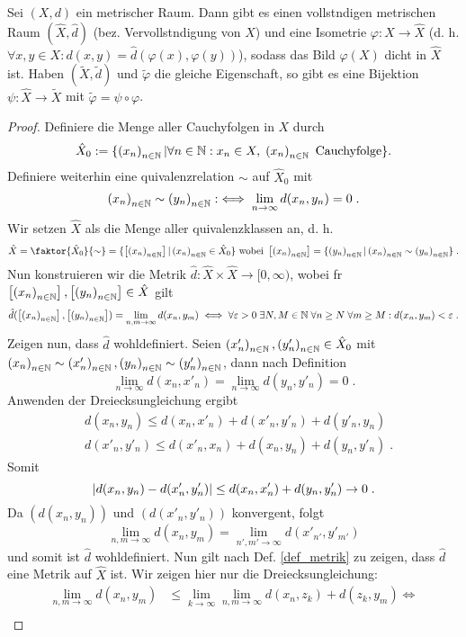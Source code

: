 \begin{theorem}
	Sei $(X,d)$ ein metrischer Raum. Dann gibt es einen vollst\as ndigen metrischen Raum $(\hat X, \hat d)$ (bez. Vervollst\as ndigung von $X$) und eine Isometrie \(\varphi: X \to \hat X\) (d. h. \(\forall x, y \in X: d(x,y) = \hat d (\varphi(x), \varphi(y))\)), sodass das Bild $\varphi(X)$ dicht in $\hat X$ ist. Haben $(\tilde X, \tilde d)$ und $\tilde \varphi$ die gleiche Eigenschaft, so gibt es eine Bijektion \(\psi: \hat X \to \tilde X\) mit \(\tilde \varphi = \psi \circ \varphi\).
	\label{vervollst_mR}
\end{theorem}
\begin{proof}
	Definiere die Menge aller Cauchyfolgen in $X$ durch 
	\[\hat X_0 := \{\left (x_n\right )_{n\in \mathbb{N}} \vert \forall n \in \mathbb{N}: x_n \in X, \; \left (x_n\right )_{n\in \mathbb{N}} \text{ Cauchyfolge}\}.\]
	Definiere weiterhin eine \As quivalenzrelation $\sim$ auf $\hat X_0$ mit 
	\[\left (x_n\right )_{n\in \mathbb{N}} \sim \left (y_n\right )_{n\in \mathbb{N}} :\iff \lim_{n\to\infty} d(x_n, y_n) = 0\;.\]
	Wir setzen $\hat X$ als die Menge aller \As quivalenzklassen an, d. h.
	\[\hat X = \faktor{\hat X_0}{\sim} = \{\equ{\seq xn} \vert \seq xn \in \hat X_0\} \text { wobei } \equ{\seq xn} = \{\seq yn \vert \seq xn \sim \seq yn\}\;. \]
	Nun konstruieren wir die Metrik $\hat d: \hat X \times \hat X \to  [0, \infty) $, wobei f\us r \(\left[ \left (x_n\right )_{n\in \mathbb{N}}\right], \left[ \left (y_n\right )_{n\in \mathbb{N}}\right] \in \hat X\) gilt
	\[\hat d(\left[ \left (x_n\right )_{n\in \mathbb{N}}\right], \left[ \left (y_n\right )_{n\in \mathbb{N}}\right]) = \lim_{n, m\to \infty} d(x_n, y_m) \iff \forall \varepsilon > 0 \;\exists N, M \in \mathbb{N}\;\forall n \geq N \; \forall m \geq M: d(x_n, y_m) < \varepsilon\; . \]
	Zeigen nun, dass $\hat d$ wohldefiniert. Seien $\left (x'_n\right )_{n\in \mathbb{N}}, \left (y'_n\right )_{n\in \mathbb{N}} \in \hat X_0$ mit \(\left (x_n\right )_{n\in \mathbb{N}} \sim \left (x'_n\right )_{n\in \mathbb{N}}, \left (y_n\right )_{n\in \mathbb{N}} \sim \left (y'_n\right )_{n\in \mathbb{N}}\), dann nach Definition
	\[\lim_{n \to \infty}d(x_n, x'_n) = \lim_{n\to\infty}d(y_n, y'_n) = 0\;.\]
	Anwenden der Dreiecksungleichung ergibt
	\begin{align*}
		& d(x_n, y_n) \leq d(x_n, x'_n) + d(x'_n, y'_n) + d(y'_n, y_n)\\
		&d(x'_n, y'_n) \leq d(x'_n, x_n) + d(x_n, y_n) + d(y_n, y'_n) \; .
	\end{align*}
	Somit
	\[\left\lvert d(x_n,y_n) - d(x'_n, y'_n) \right\rvert \leq d(x_n, x'_n) + d(y_n, y'_n) \to 0\;.\]
	Da $(d(x_n, y_n))$ und $(d(x'_n, y'_n))$ konvergent, folgt
	\[\lim_{n, m\to\infty} d(x_n, y_m) = \lim_{n',m'\to\infty} d(x'_{n'}, y'_{m'})\]
	und somit ist $\hat d$ wohldefiniert. Nun gilt nach Def. \ref{def_metrik} zu zeigen, dass $\hat d$ eine Metrik auf $\hat X$ ist. Wir zeigen hier nur die Dreiecksungleichung:
	\begin{align*}
		 \lim_{n, m \to \infty} d(x_n, y_m) &\leq \lim_{k\to\infty}\lim_{n,m \to\infty} d(x_n, z_k) + d(z_k, y_m) \iff \\

\end{align*}
\end{proof}
